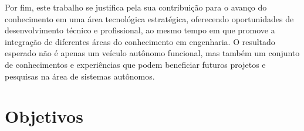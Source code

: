 Por fim, este trabalho se justifica pela sua contribuição para o avanço do
conhecimento em uma área tecnológica estratégica, oferecendo oportunidades de
desenvolvimento técnico e profissional, ao mesmo tempo em que promove a
integração de diferentes áreas do conhecimento em engenharia. O resultado
esperado não é apenas um veículo autônomo funcional, mas também um conjunto de
conhecimentos e experiências que podem beneficiar futuros projetos e pesquisas
na área de sistemas autônomos.

\section*{Objetivos}\label{sec:objetivos}

\lipsum[36]
